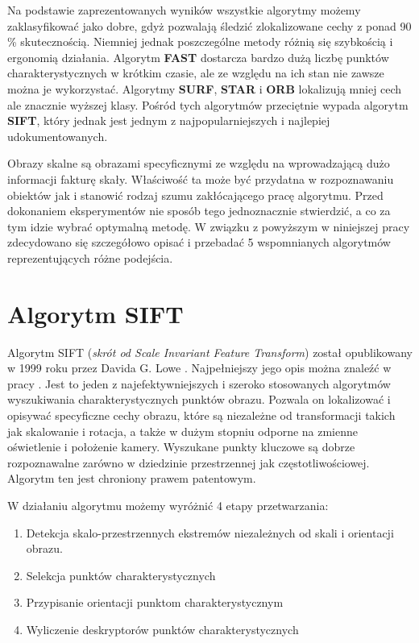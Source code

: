 \newpage


Na podstawie zaprezentowanych wyników wszystkie algorytmy możemy zaklasyfikować jako dobre, gdyż pozwalają śledzić zlokalizowane cechy z ponad 90 \% skutecznością. Niemniej jednak poszczególne metody różnią się szybkością i ergonomią działania. Algorytm \textbf{FAST} dostarcza bardzo dużą liczbę punktów charakterystycznych w krótkim czasie, ale ze względu na ich stan nie zawsze można je wykorzystać. Algorytmy \textbf{SURF}, \textbf{STAR} i \textbf{ORB} lokalizują mniej cech ale znacznie wyższej klasy. Pośród tych algorytmów przeciętnie wypada algorytm \textbf{SIFT}, który jednak jest jednym z najpopularniejszych i najlepiej udokumentowanych. 

Obrazy skalne są obrazami specyficznymi ze względu na wprowadzającą dużo informacji fakturę skały. Właściwość ta może być przydatna w rozpoznawaniu obiektów jak i stanowić rodzaj szumu zakłócającego pracę algorytmu. Przed dokonaniem eksperymentów nie sposób tego jednoznacznie stwierdzić, a co za tym idzie wybrać optymalną metodę. W związku z powyższym w niniejszej pracy zdecydowano się szczegółowo opisać i przebadać 5 wspomnianych algorytmów reprezentujących różne podejścia.




\newpage
\section{Algorytm SIFT}
Algorytm SIFT (\textit{skrót od Scale Invariant Feature Transform}) został opublikowany w 1999 roku przez Davida G. Lowe \cite{DGL99}. Najpełniejszy jego opis można znaleźć w pracy \cite{DGL04}.  Jest to jeden z najefektywniejszych i szeroko stosowanych algorytmów wyszukiwania charakterystycznych punktów obrazu. Pozwala on lokalizować i opisywać specyficzne cechy obrazu, które są niezależne od transformacji takich jak skalowanie i rotacja, a także w dużym stopniu odporne na zmienne oświetlenie i położenie kamery. Wyszukane punkty kluczowe są dobrze rozpoznawalne zarówno w dziedzinie przestrzennej jak częstotliwościowej. Algorytm ten jest chroniony prawem patentowym.

W działaniu algorytmu możemy wyróżnić 4 etapy przetwarzania:
\begin{enumerate}
\item Detekcja skalo-przestrzennych ekstremów niezależnych od skali i orientacji obrazu.
\item Selekcja punktów charakterystycznych
\item Przypisanie orientacji punktom charakterystycznym
\item Wyliczenie deskryptorów punktów charakterystycznych
\end{enumerate}
